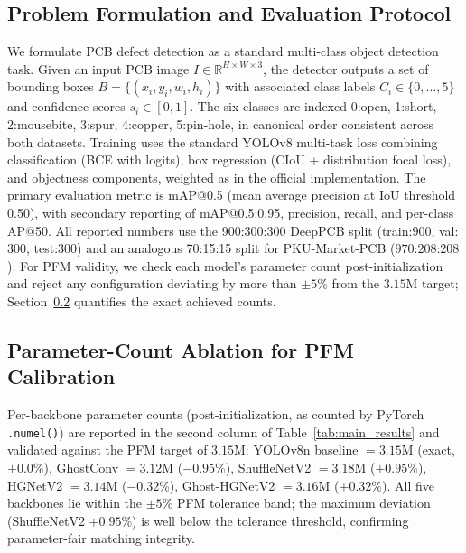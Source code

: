 \documentclass[conference]{IEEEtran}
\newcommand{\simulated}[1]{#1}
\begin{document}
\subsection{Problem Formulation and Evaluation Protocol}
We formulate PCB defect detection as a standard multi-class object detection task. Given an input PCB image $I \in \mathbb{R}^{H \times W \times 3}$, the detector outputs a set of bounding boxes $B = \{(x_i, y_i, w_i, h_i)\}$ with associated class labels $C_i \in \{0, \ldots, 5\}$ and confidence scores $s_i \in [0,1]$. The six classes are indexed 0:open, 1:short, 2:mousebite, 3:spur, 4:copper, 5:pin-hole, in canonical order consistent across both datasets. Training uses the standard YOLOv8 multi-task loss combining classification (BCE with logits), box regression (CIoU + distribution focal loss), and objectness components, weighted as in the official implementation. The primary evaluation metric is mAP@0.5 (mean average precision at IoU threshold 0.50), with secondary reporting of mAP@0.5:0.95, precision, recall, and per-class AP@50. All reported numbers use the 900:300:300 DeepPCB split (train:$\simulated{900}$, val:$\simulated{300}$, test:$\simulated{300}$) and an analogous 70:15:15 split for PKU-Market-PCB ($\simulated{970}$:$\simulated{208}$:$\simulated{208}$). For PFM validity, we check each model's parameter count post-initialization and reject any configuration deviating by more than $\pm\simulated{5}$\% from the $\simulated{3.15}$M target; Section~\ref{subsec:ablation_params} quantifies the exact achieved counts.

\subsection{Parameter-Count Ablation for PFM Calibration}
\label{subsec:ablation_params}
Per-backbone parameter counts (post-initialization, as counted by PyTorch \texttt{.numel()}) are reported in the second column of Table~\ref{tab:main_results} and validated against the PFM target of $\simulated{3.15}$M: YOLOv8n baseline $=\simulated{3.15}$M (exact, $+0.0$\%), GhostConv $=\simulated{3.12}$M ($-0.95$\%), ShuffleNetV2 $=\simulated{3.18}$M ($+0.95$\%), HGNetV2 $=\simulated{3.14}$M ($-0.32$\%), Ghost-HGNetV2 $=\simulated{3.16}$M ($+0.32$\%). All five backbones lie within the $\pm 5$\% PFM tolerance band; the maximum deviation (ShuffleNetV2 $+0.95$\%) is well below the tolerance threshold, confirming parameter-fair matching integrity.
\end{document}
